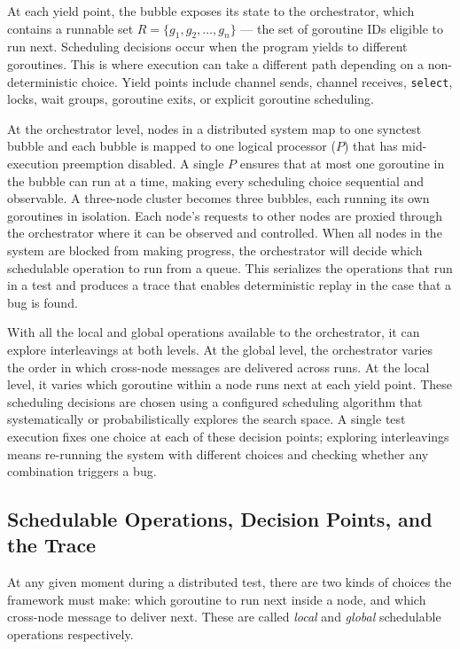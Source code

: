 \documentclass[11pt]{article}
\begin{document}
At each yield point, the bubble exposes its state to the orchestrator, which contains a runnable set $R = \{g_1, g_2, \ldots, g_n\}$ --- the set of goroutine IDs eligible to run next. Scheduling decisions occur when the program yields to different goroutines. This is where execution can take a different path depending on a non-deterministic choice. Yield points include channel sends, channel receives, \texttt{select}, locks, wait groups, goroutine exits, or explicit goroutine scheduling.

At the orchestrator level, nodes in a distributed system map to one synctest bubble and each bubble is mapped to one logical processor ($P$) that has mid-execution preemption disabled. A single $P$ ensures that at most one goroutine in the bubble can run at a time, making every scheduling choice sequential and observable. A three-node cluster becomes three bubbles, each running its own goroutines in isolation. Each node's requests to other nodes are proxied through the orchestrator where it can be observed and controlled. When all nodes in the system are blocked from making progress, the orchestrator will decide which schedulable operation to run from a queue. This serializes the operations that run in a test and produces a trace that enables deterministic replay in the case that a bug is found.

With all the local and global operations available to the orchestrator, it can explore interleavings at both levels. At the global level, the orchestrator varies the order in which cross-node messages are delivered across runs. At the local level, it varies which goroutine within a node runs next at each yield point. These scheduling decisions are chosen using a configured scheduling algorithm that systematically or probabilistically explores the search space. A single test execution fixes one choice at each of these decision points; exploring interleavings means re-running the system with different choices and checking whether any combination triggers a bug.

\subsection{Schedulable Operations, Decision Points, and the Trace}

At any given moment during a distributed test, there are two kinds of choices the framework must make: which goroutine to run next inside a node, and which cross-node message to deliver next. These are called \emph{local} and \emph{global} schedulable operations respectively.
\end{document}
